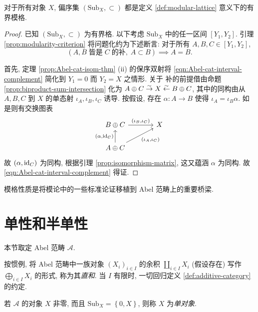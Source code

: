\begin{theorem}\label{prop:subobject-modularity}
	对于所有对象 $X$, 偏序集 $(\mathrm{Sub}_X, \subset)$ 都是定义 \ref{def:modular-lattice} 意义下的有界模格.
\end{theorem}
\begin{proof}
	已知 $(\mathrm{Sub}_X, \subset)$ 为有界格. 以下考虑 $\mathrm{Sub}_X$ 中的任一区间 $[Y_1, Y_2]$. 引理 \ref{prop:modularity-criterion} 将问题化约为下述断言: 对于所有 $A, B, C \in [Y_1, Y_2]$,
	\begin{equation}\label{eqn:Abel-cat-interval-complement}
		\left( A, B \;\text{皆是}\; C\; \text{的补}, \; A \subset B \right) \implies A = B.
	\end{equation}

	首先, 定理 \ref{prop:Abel-cat-isom-thm} (ii) 的保序双射将 \eqref{eqn:Abel-cat-interval-complement} 简化到 $Y_1 = 0$ 而 $Y_2 = X$ 之情形. 关于
	补的前提借由命题 \ref{prop:biproduct-sum-intersection} 化为 $A \oplus C \stackrel{\sim}{\rightarrow} X \stackrel{\sim}{\leftarrow} B \oplus C$, 其中的同构由从 $A, B, C$ 到 $X$ 的单态射 $\iota_A, \iota_B, \iota_C$ 诱导. 按假设, 存在 $\alpha: A \to B$ 使得 $\iota_A = \iota_B \alpha$. 如是则有交换图表
	\[\begin{tikzcd}[column sep=large]
		B \oplus C \arrow[r, "{(\iota_B, \iota_C)}"] & X \\
		A \oplus C \arrow[ru, "{(\iota_A, \iota_C)}"'] \arrow[u, "{(\alpha, \identity_C)}"] &   
	\end{tikzcd}\]
	故 $(\alpha, \mathrm{id}_C)$ 为同构, 根据引理 \ref{prop:isomorphism-matrix}, 这又蕴涵 $\alpha$ 为同构. 故 \eqref{eqn:Abel-cat-interval-complement} 得证.
\end{proof}

模格性质是将模论中的一些标准论证移植到 Abel 范畴上的重要桥梁.

\section{单性和半单性}\label{sec:semisimple}
本节取定 Abel 范畴 $\mathcal{A}$.

\begin{convention}\label{con:direct-sum}
	按惯例, 将 Abel 范畴中一族对象 $(X_i)_{i \in I}$ 的余积 $\coprod_{i \in I} X_i$ (假设存在) 写作 $\bigoplus_{i \in I} X_i$ 的形式, 称为其\emph{直和}. 当 $I$ 有限时, 一切回归定义 \ref{def:additive-category} 的约定.
\end{convention}

\begin{definition}
	若 $\mathcal{A}$ 的对象 $X$ 非零, 而且 $\mathrm{Sub}_X = \left\{0, X \right\}$, 则称 $X$ 为\emph{单对象}.
\end{definition}

